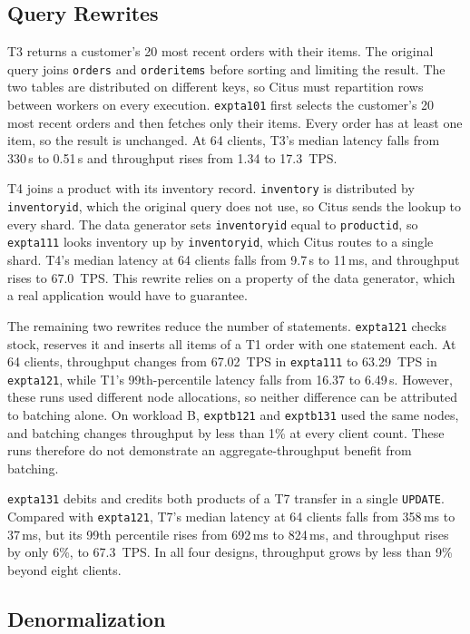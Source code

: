 \documentclass[sigconf,10pt,nonacm]{acmart}
\newcommand{\expt}[1]{\texttt{expt\textunderscore #1}}
\renewcommand{\_}{\underscorewithoutbreak\allowbreak}
\begin{document}
\subsection{Query Rewrites}
\label{sec:rewrites}

T3 returns a customer's 20 most recent orders with their items. The original query
joins \texttt{orders} and \texttt{order\_items} before sorting and limiting the result.
The two tables are distributed on different keys, so Citus must repartition rows
between workers on every execution. \expt{a101} first selects the customer's 20 most
recent orders and then fetches only their items. Every order has at least one item, so
the result is unchanged. At 64 clients, T3's median latency falls from 330\,s to
0.51\,s and throughput rises from 1.34 to 17.3~TPS.

T4 joins a product with its inventory record. \texttt{inventory} is distributed by
\texttt{inventory\_id}, which the original query does not use, so Citus sends the
lookup to every shard. The data generator sets \texttt{inventory\_id} equal to
\texttt{product\_id}, so \expt{a111} looks inventory up by \texttt{inventory\_id},
which Citus routes to a single shard. T4's median latency at 64 clients falls from
9.7\,s to 11\,ms, and throughput rises to 67.0~TPS. This rewrite relies on a property of
the data generator, which a real application would have to guarantee.

The remaining two rewrites reduce the number of statements. \expt{a121} checks stock,
reserves it and inserts all items of a T1 order with one statement each.
At 64 clients, throughput changes from 67.02~TPS in \expt{a111} to 63.29~TPS in
\expt{a121}, while T1's 99th-percentile latency falls from 16.37 to 6.49\,s.
However, these runs used different node allocations, so neither difference can be
attributed to batching alone. On workload B, \expt{b121} and \expt{b131} used the
same nodes, and batching changes throughput by less than 1\% at every client count.
These runs therefore do not demonstrate an aggregate-throughput benefit from
batching.

\expt{a131} debits and credits both products of a T7 transfer in a single
\texttt{UPDATE}.
Compared with \expt{a121}, T7's median latency at 64 clients falls from 358\,ms to
37\,ms, but its 99th percentile rises from 692\,ms to 824\,ms, and throughput rises by
only 6\%, to 67.3~TPS. In all four designs, throughput grows by less than 9\% beyond
eight clients.

\subsection{Denormalization}
\label{sec:denormalization}
\end{document}

